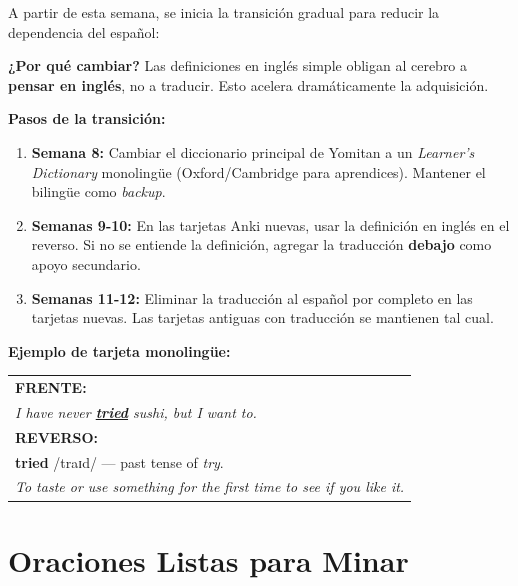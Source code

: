 \documentclass[12pt,a4paper]{article}
\begin{document}
\begin{cajatransicion}
A partir de esta semana, se inicia la transición gradual para reducir la dependencia del español:

\medskip
\textbf{¿Por qué cambiar?} Las definiciones en inglés simple obligan al cerebro a \textbf{pensar en inglés}, no a traducir. Esto acelera dramáticamente la adquisición.

\medskip
\textbf{Pasos de la transición:}
\begin{enumerate}[leftmargin=1.2cm]
  \item \textbf{Semana 8:} Cambiar el diccionario principal de Yomitan a un \textit{Learner's Dictionary} monolingüe (Oxford/Cambridge para aprendices). Mantener el bilingüe como \textit{backup}.
  
  \item \textbf{Semanas 9-10:} En las tarjetas Anki nuevas, usar la definición en inglés en el reverso. Si no se entiende la definición, agregar la traducción \textbf{debajo} como apoyo secundario.
  
  \item \textbf{Semanas 11-12:} Eliminar la traducción al español por completo en las tarjetas nuevas. Las tarjetas antiguas con traducción se mantienen tal cual.
\end{enumerate}

\medskip
\textbf{Ejemplo de tarjeta monolingüe:}

\begin{center}
\begin{tabularx}{0.85\textwidth}{|X|}
\hline
\textbf{FRENTE:} \\
\textit{I have never \underline{\textbf{tried}} sushi, but I want to.} \\
\hline
\textbf{REVERSO:} \\
\textbf{tried} /traɪd/ — past tense of \textit{try}. \\
\textit{To taste or use something for the first time to see if you like it.} \\
\hline
\end{tabularx}
\end{center}
\end{cajatransicion}

\section{Oraciones Listas para Minar}
\end{document}
